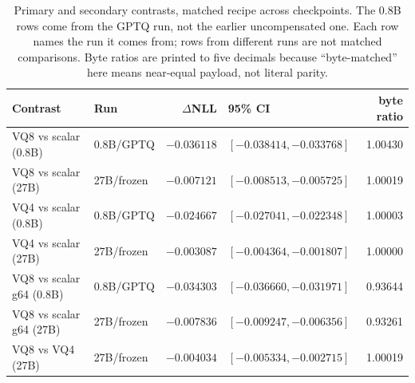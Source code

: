 \begin{table}[t]
\centering
\small
\begin{tabular}{llrlr}
\toprule
Contrast & Run & $\Delta$NLL & 95\% CI & byte ratio \\
\midrule
VQ8 vs scalar (0.8B) & 0.8B/GPTQ & $-0.036118$ & $[-0.038414, -0.033768]$ & 1.00430 \\
VQ8 vs scalar (27B) & 27B/frozen & $-0.007121$ & $[-0.008513, -0.005725]$ & 1.00019 \\
VQ4 vs scalar (0.8B) & 0.8B/GPTQ & $-0.024667$ & $[-0.027041, -0.022348]$ & 1.00003 \\
VQ4 vs scalar (27B) & 27B/frozen & $-0.003087$ & $[-0.004364, -0.001807]$ & 1.00000 \\
VQ8 vs scalar g64 (0.8B) & 0.8B/GPTQ & $-0.034303$ & $[-0.036660, -0.031971]$ & 0.93644 \\
VQ8 vs scalar g64 (27B) & 27B/frozen & $-0.007836$ & $[-0.009247, -0.006356]$ & 0.93261 \\
VQ8 vs VQ4 (27B) & 27B/frozen & $-0.004034$ & $[-0.005334, -0.002715]$ & 1.00019 \\
\bottomrule
\end{tabular}
\caption{Primary and secondary contrasts, matched recipe across checkpoints. The 0.8B rows come from the GPTQ run, not the earlier uncompensated one. Each row names the run it comes from; rows from different runs are not matched comparisons. Byte ratios are printed to five decimals because ``byte-matched'' here means near-equal payload, not literal parity.}
\label{tab:primary}
\end{table}
